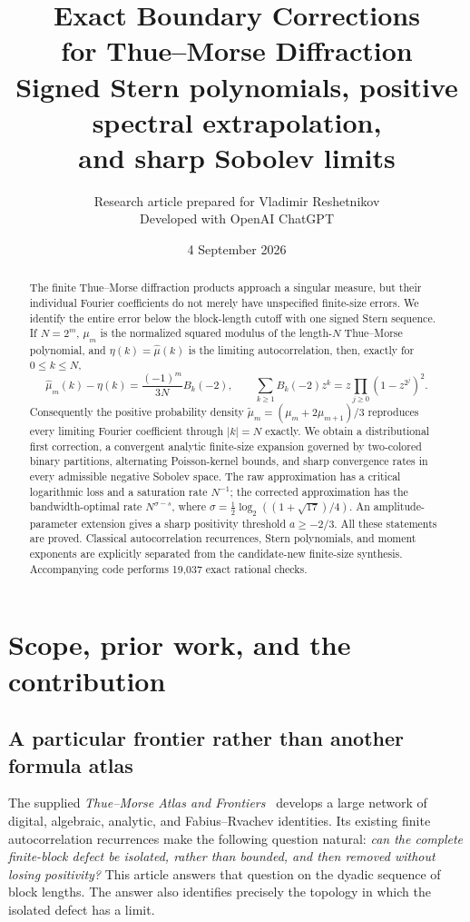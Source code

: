 \documentclass[11pt,a4paper]{article}
\title{\bfseries Exact Boundary Corrections\\for Thue--Morse Diffraction\\[0.5em]
\large Signed Stern polynomials, positive spectral extrapolation,\\
and sharp Sobolev limits}
\author{Research article prepared for Vladimir Reshetnikov\\
\small Developed with OpenAI ChatGPT}
\date{4 September 2026}
\numberwithin{equation}{section}
\theoremstyle{definition}
\theoremstyle{remark}
\begin{document}
\maketitle
\begin{abstract}
The finite Thue--Morse diffraction products approach a singular measure, but their
individual Fourier coefficients do not merely have unspecified finite-size errors.
We identify the entire error below the block-length cutoff with one signed Stern
sequence. If $N=2^m$, $\mu_m$ is the normalized squared modulus of the length-$N$
Thue--Morse polynomial, and $\eta(k)=\widehat\mu(k)$ is the limiting autocorrelation,
then, exactly for $0\le k\le N$,
\[
 \widehat\mu_m(k)-\eta(k)=\frac{(-1)^m}{3N}B_k(-2),
 \qquad \sum_{k\ge1}B_k(-2)z^k
 =z\prod_{j\ge0}(1-z^{2^j})^2.
\]
Consequently the positive probability density
$\widetilde\mu_m=(\mu_m+2\mu_{m+1})/3$ reproduces every limiting Fourier coefficient
through $|k|=N$ exactly. We obtain a distributional first correction, a convergent
analytic finite-size expansion governed by two-colored binary partitions, alternating
Poisson-kernel bounds, and sharp convergence rates in every admissible negative
Sobolev space. The raw approximation has a critical logarithmic loss and a saturation
rate $N^{-1}$; the corrected approximation has the bandwidth-optimal rate
$N^{\sigma-s}$, where
$\sigma=\tfrac12\log_2((1+\sqrt{17})/4)$.
An amplitude-parameter extension gives a sharp positivity threshold $a\ge-2/3$.
All these statements are proved. Classical autocorrelation recurrences, Stern
polynomials, and moment exponents are explicitly separated from the candidate-new
finite-size synthesis. Accompanying code performs 19,037 exact rational checks.
\end{abstract}
\tableofcontents
\clearpage

\section{Scope, prior work, and the contribution}
\label{sec:scope}

\subsection{A particular frontier rather than another formula atlas}
The supplied \emph{Thue--Morse Atlas and Frontiers}~\cite{atlas} develops a large
network of digital, algebraic, analytic, and Fabius--Rvachev identities. Its existing
finite autocorrelation recurrences make the following question natural:
\emph{can the complete finite-block defect be isolated, rather than bounded, and
then removed without losing positivity?} This article answers that question on the
dyadic sequence of block lengths. The answer also identifies precisely the topology
in which the isolated defect has a limit.
\end{document}
